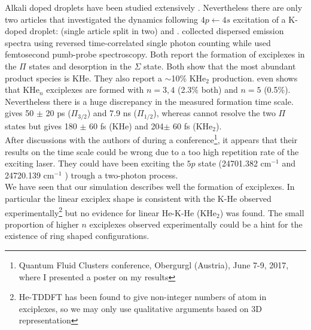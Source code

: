 Alkali doped droplets have been studied extensively \cite{Sti1996,Lac2011,Lac2012,Bru2001,Her2012,Log2014,Log2015,Van2017}. 
Nevertheless there are only two articles that investigated the dynamics following $4p\leftarrow 4s$ excitation of a K-doped droplet: \cite{Reh2000A,Reh2000B} (single article split in two) and \cite{Sch2001}. 
\cite{Reh2000A,Reh2000B} collected dispersed emission spectra using reversed time-correlated single photon counting while \cite{Sch2001} used femtosecond pumb-probe spectroscopy. 
Both report the formation of exciplexes in the $\Pi$ states and desorption in the $\Sigma$ state. 
Both show that the most abundant product species is KHe.
They also report a $\sim$10\% KHe$_2$ production. \cite{Sch2001} even shows that KHe$_n$ exciplexes are formed with $n=3,4$ (2.3\% both) and $n=5$ (0.5\%). 
Nevertheless there is a huge discrepancy in the measured formation time scale. 
\cite{Reh2000A,Reh2000B} gives 50 $\pm$ 20 ps ($\Pi_{3/2}$) and 7.9 ns ($\Pi_{1/2}$),  whereas \cite{Sch2001} cannot resolve the two $\Pi$ states but gives 180 $\pm$ 60 fs (KHe) and 204$ \pm$ 60 fs (KHe$_2$).\\ 

After discussions with the authors of \cite{Sch2001} during a conference\footnote{Quantum Fluid Clusters conference, Obergurgl (Austria), June 7-9, 2017, where I presented a poster on my results}, it appears that their results on the time scale could be wrong due to a too high repetition rate of the exciting laser. 
They could have been exciting the $5p$ state (24701.382 cm$^{-1}$ and 24720.139 cm$^{-1}$ \cite{Nist}) trough a two-photon process. \\

We have seen that our simulation describes well the formation of exciplexes.
In particular the linear exciplex shape is consistent with the  K-He observed experimentally\footnote{He-TDDFT has been found to give non-integer numbers of atom in exciplexes, so we may only use qualitative arguments based on 3D representation} but no evidence for linear He-K-He (KHe$_2$) was found. The small proportion of higher $n$ exciplexes observed experimentally could be a hint for the existence of ring shaped configurations.\\

